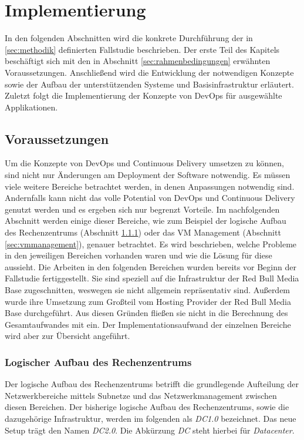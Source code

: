 \chapter{Implementierung}
\label{sec:implementierung}
In den folgenden Abschnitten wird die konkrete Durchführung der in \autoref{sec:methodik} definierten Fallstudie beschrieben. Der erste Teil des Kapitels beschäftigt sich mit den in Abschnitt \ref{sec:rahmenbedingungen} erwähnten Voraussetzungen. Anschließend wird die Entwicklung der notwendigen Konzepte sowie der Aufbau der unterstützenden Systeme und Basisinfrastruktur erläutert. Zuletzt folgt die Implementierung der Konzepte von DevOps für ausgewählte Applikationen.

\section{Voraussetzungen}
\label{sec:voraussetzungen}
Um die Konzepte von DevOps und Continuous Delivery umsetzen zu können, sind nicht nur Änderungen am Deployment der Software notwendig. Es müssen viele weitere Bereiche betrachtet werden, in denen Anpassungen notwendig sind. Andernfalls kann nicht das volle Potential von DevOps und Continuous Delivery genutzt werden und es ergeben sich nur begrenzt Vorteile. Im nachfolgenden Abschnitt werden einige dieser Bereiche, wie zum Beispiel der logische Aufbau des Rechenzentrums (Abschnitt \ref{sec:netzwerk}) oder das VM Management (Abschnitt \ref{sec:vmmanagement}), genauer betrachtet. Es wird beschrieben, welche Probleme in den jeweiligen Bereichen vorhanden waren und wie die Lösung für diese aussieht. Die Arbeiten in den folgenden Bereichen wurden bereits vor Beginn der Fallstudie fertiggestellt. Sie sind speziell auf die Infrastruktur der Red Bull Media Base zugeschnitten, weswegen sie nicht allgemein repräsentativ sind. Außerdem wurde ihre Umsetzung zum Großteil vom Hosting Provider der Red Bull Media Base durchgeführt. Aus diesen Gründen fließen sie nicht in die Berechnung des Gesamtaufwandes mit ein. Der Implementationsaufwand der einzelnen Bereiche wird aber zur Übersicht angeführt.

\subsection{Logischer Aufbau des Rechenzentrums}
\label{sec:netzwerk}
Der logische Aufbau des Rechenzentrums betrifft die grundlegende Aufteilung der Netzwerkbereiche mittels Subnetze und das Netzwerkmanagement zwischen diesen Bereichen. Der bisherige logische Aufbau des Rechenzentrums, sowie die dazugehörige Infrastruktur, werden im folgenden als \textit{DC1.0} bezeichnet. Das neue Setup trägt den Namen \textit{DC2.0}. Die Abkürzung \textit{DC} steht hierbei für \textit{Datacenter}.


